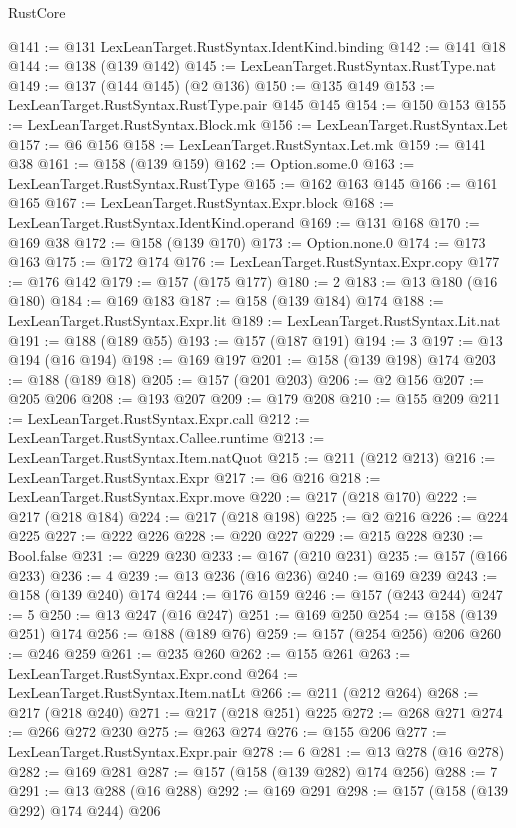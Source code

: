 \begin{lexlean}{RustCore}
\begin{coremodule}
@141 := @131 LexLeanTarget.RustSyntax.IdentKind.binding
@142 := @141 @18
@144 := @138 (@139 @142)
@145 := LexLeanTarget.RustSyntax.RustType.nat
@149 := @137 (@144 @145) (@2 @136)
@150 := @135 @149
@153 := LexLeanTarget.RustSyntax.RustType.pair @145 @145
@154 := @150 @153
@155 := LexLeanTarget.RustSyntax.Block.mk
@156 := LexLeanTarget.RustSyntax.Let
@157 := @6 @156
@158 := LexLeanTarget.RustSyntax.Let.mk
@159 := @141 @38
@161 := @158 (@139 @159)
@162 := Option.some.{0}
@163 := LexLeanTarget.RustSyntax.RustType
@165 := @162 @163 @145
@166 := @161 @165
@167 := LexLeanTarget.RustSyntax.Expr.block
@168 := LexLeanTarget.RustSyntax.IdentKind.operand
@169 := @131 @168
@170 := @169 @38
@172 := @158 (@139 @170)
@173 := Option.none.{0}
@174 := @173 @163
@175 := @172 @174
@176 := LexLeanTarget.RustSyntax.Expr.copy
@177 := @176 @142
@179 := @157 (@175 @177)
@180 := 2
@183 := @13 @180 (@16 @180)
@184 := @169 @183
@187 := @158 (@139 @184) @174
@188 := LexLeanTarget.RustSyntax.Expr.lit
@189 := LexLeanTarget.RustSyntax.Lit.nat
@191 := @188 (@189 @55)
@193 := @157 (@187 @191)
@194 := 3
@197 := @13 @194 (@16 @194)
@198 := @169 @197
@201 := @158 (@139 @198) @174
@203 := @188 (@189 @18)
@205 := @157 (@201 @203)
@206 := @2 @156
@207 := @205 @206
@208 := @193 @207
@209 := @179 @208
@210 := @155 @209
@211 := LexLeanTarget.RustSyntax.Expr.call
@212 := LexLeanTarget.RustSyntax.Callee.runtime
@213 := LexLeanTarget.RustSyntax.Item.natQuot
@215 := @211 (@212 @213)
@216 := LexLeanTarget.RustSyntax.Expr
@217 := @6 @216
@218 := LexLeanTarget.RustSyntax.Expr.move
@220 := @217 (@218 @170)
@222 := @217 (@218 @184)
@224 := @217 (@218 @198)
@225 := @2 @216
@226 := @224 @225
@227 := @222 @226
@228 := @220 @227
@229 := @215 @228
@230 := Bool.false
@231 := @229 @230
@233 := @167 (@210 @231)
@235 := @157 (@166 @233)
@236 := 4
@239 := @13 @236 (@16 @236)
@240 := @169 @239
@243 := @158 (@139 @240) @174
@244 := @176 @159
@246 := @157 (@243 @244)
@247 := 5
@250 := @13 @247 (@16 @247)
@251 := @169 @250
@254 := @158 (@139 @251) @174
@256 := @188 (@189 @76)
@259 := @157 (@254 @256) @206
@260 := @246 @259
@261 := @235 @260
@262 := @155 @261
@263 := LexLeanTarget.RustSyntax.Expr.cond
@264 := LexLeanTarget.RustSyntax.Item.natLt
@266 := @211 (@212 @264)
@268 := @217 (@218 @240)
@271 := @217 (@218 @251) @225
@272 := @268 @271
@274 := @266 @272 @230
@275 := @263 @274
@276 := @155 @206
@277 := LexLeanTarget.RustSyntax.Expr.pair
@278 := 6
@281 := @13 @278 (@16 @278)
@282 := @169 @281
@287 := @157 (@158 (@139 @282) @174 @256)
@288 := 7
@291 := @13 @288 (@16 @288)
@292 := @169 @291
@298 := @157 (@158 (@139 @292) @174 @244) @206

\end{coremodule}
\end{lexlean}
